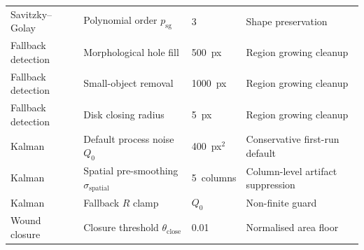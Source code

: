 \begin{table}[H]
\begin{tabular}{llll}
Savitzky--Golay     & Polynomial order $p_\text{sg}$           & 3             & Shape preservation \\
Fallback detection  & Morphological hole fill                  & 500~px        & Region growing cleanup \\
Fallback detection  & Small-object removal                     & 1000~px       & Region growing cleanup \\
Fallback detection  & Disk closing radius                      & 5~px          & Region growing cleanup \\
Kalman              & Default process noise $Q_0$              & 400~px$^2$    & Conservative first-run default \\
Kalman              & Spatial pre-smoothing $\sigma_\text{spatial}$ & 5~columns & Column-level artifact suppression \\
Kalman              & Fallback $R$ clamp                       & $Q_0$         & Non-finite guard \\
Wound closure       & Closure threshold $\theta_\text{close}$  & 0.01          & Normalised area floor \\
\bottomrule
\end{tabular}
\end{table}
